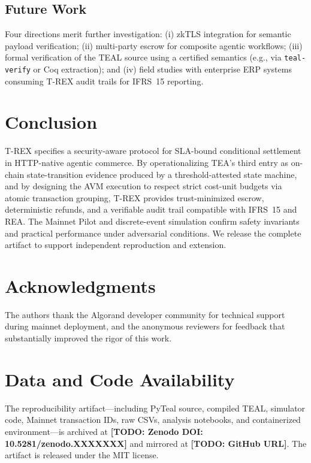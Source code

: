 \documentclass[journal]{IEEEtran}
\newcommand{\TODO}[1]{{\color{red}\textbf{[TODO: #1]}}}
\begin{document}
\subsection{Future Work}
Four directions merit further investigation: (i) zkTLS integration for semantic payload verification; (ii) multi-party escrow for composite agentic workflows; (iii) formal verification of the TEAL source using a certified semantics (e.g., via \texttt{teal-verify} or Coq extraction); and (iv) field studies with enterprise ERP systems consuming T-REX audit trails for IFRS~15 reporting.

\section{Conclusion}
\label{sec:conclusion}
T-REX specifies a security-aware protocol for SLA-bound conditional settlement in HTTP-native agentic commerce. By operationalizing TEA's third entry as on-chain state-transition evidence produced by a threshold-attested state machine, and by designing the AVM execution to respect strict cost-unit budgets via atomic transaction grouping, T-REX provides trust-minimized escrow, deterministic refunds, and a verifiable audit trail compatible with IFRS~15 and REA. The Mainnet Pilot and discrete-event simulation confirm safety invariants and practical performance under adversarial conditions. We release the complete artifact to support independent reproduction and extension.

\section*{Acknowledgments}
The authors thank the Algorand developer community for technical support during mainnet deployment, and the anonymous reviewers for feedback that substantially improved the rigor of this work.

\section*{Data and Code Availability}
\label{sec:reproducibility}
The reproducibility artifact---including PyTeal source, compiled TEAL, simulator code, Mainnet transaction IDs, raw CSVs, analysis notebooks, and containerized environment---is archived at \TODO{Zenodo DOI: 10.5281/zenodo.XXXXXXX} and mirrored at \TODO{GitHub URL}. The artifact is released under the MIT license.
\end{document}
